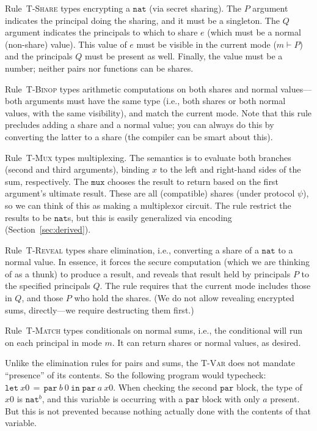 \documentclass[10pt]{article}
\newcommand{\rulelab}[1]{{\small \textsc{#1}}}
\newcommand{\kw}[1]{\ensuremath{\mathtt{#1}}}
\newcommand{\tnat}{\ensuremath{\mathtt{nat}}}
\newcommand{\elet}[3]{\ensuremath{\kw{let}~#1\, =\, #2~\kw{in}\;{#3}}}
\newcommand{\epar}[2]{\ensuremath{\kw{par}~{#1}~{#2}}}
\begin{document}
Rule~\rulelab{T-Share} types encrypting a $\tnat$ (via secret
sharing). The $P$ argument indicates the principal doing the sharing,
and it must be a singleton. The $Q$ argument indicates the principals
to which to share $e$ (which must be a normal (non-share) value). This
value of $e$ must be visible in the current mode ($m \vdash P$) and
the principals $Q$ must be present as well. Finally, the value must be
a number; neither pairs nor functions can be shares.

Rule~\rulelab{T-Binop} types arithmetic computations on both shares
and normal values---both arguments must have the same type (i.e., both
shares or both normal values, with the same visibility), and match the
current mode. Note that this rule precludes adding a 
share and a normal value; you can always do this by converting the
latter to a share (the compiler can be smart about this).

Rule~\rulelab{T-Mux} types multiplexing. The semantics is to evaluate
both branches (second and third arguments), binding $x$ to the left
and right-hand sides of the sum, respectively. The $\kw{mux}$ chooses
the result to return based on the first argument's ultimate
result. These are all (compatible) shares (under protocol $\psi$), so
we can think of this as making a multiplexor circuit. The rule
restrict the results to be $\tnat$s, but this is easily generalized
via encoding (Section~\ref{sec:derived}).

Rule~\rulelab{T-Reveal} types share elimination, i.e., converting a
share of a $\tnat$ to a normal value. In essence, it forces the secure
computation (which we are thinking of as a thunk) to produce a result,
and reveals that result held by principals $P$ to the specified
principals $Q$. The rule requires that the current mode includes those
in $Q$, and those $P$ who hold the shares. (We do not allow revealing
encrypted sums, directly---we require destructing them first.)

Rule~\rulelab{T-Match} types conditionals on normal sums, i.e., the
conditional will run on each principal in mode $m$. It can return
shares or normal values, as desired. 

Unlike the elimination rules for pairs and sums, the \rulelab{T-Var}
does not mandate ``presence'' of its contents. So the following
program would typecheck: $\elet{x0}{\epar{b}0}{\epar{a}{x0}}$. When
checking the second $\kw{par}$ block, the type of $x0$ is $\tnat^{b}$,
and this variable is occurring with a $\kw{par}$ block with only $a$
present. But this is not prevented because nothing actually done with
the contents of that variable.
\end{document}
